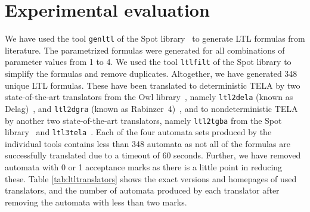 \documentclass[a4paper,UKenglish,cleveref,autoref,thm-restate]{lipics-v2021}
\newcommand{\todo}[1]{\marginpar{\textcolor{red}{#1}}}
\def\false{\mathit{false}}
\def\true{\mathit{true}}
\begin{document}




\section{Experimental evaluation}\label{sec:experiments}

\todo{Upravit experimenty: pridat dalsi 2 sady automatu.}
We have used the tool \texttt{genltl} of the Spot
library~\cite{duret.16.atva2} to generate LTL formulas from
literature. The parametrized formulas were generated for all
combinations of parameter values from 1 to 4. We used the tool
\texttt{ltlfilt} of the Spot library to simplify the formulas and
remove duplicates. Altogether, we have generated 348 unique LTL
formulas. These have been translated to deterministic TELA by two
state-of-the-art translators from the Owl
library~\cite{kretinsky.18.atva}, namely \texttt{ltl2dela} (known as
Delag)~\cite{muller.17.gandalf}, and \texttt{ltl2dgra} (known as
Rabinzer~4)~\cite{kretinsky.18.cav}, and to nondeterministic TELA by
another two state-of-the-art translators, namely \texttt{ltl2tgba}
from the Spot library~\cite{duret.16.atva2} and
\texttt{ltl3tela}~\cite{major.19.atva}. Each of the four automata sets
produced by the individual tools contains less than 348 automata as not
all of the formulas are successfully translated due to a timeout of 60
seconds. Further, we have removed automata with 0 or 1 acceptance
marks as there is a little point in reducing these. Table
\ref{tab:ltltranslators} shows the exact versions and homepages of
used translators, and the number of automata produced by each
translator after removing the automata with less than two marks.
\end{document}
